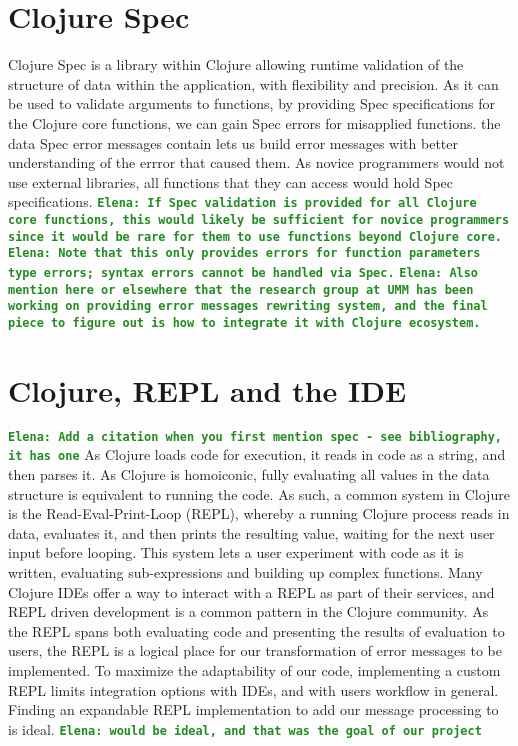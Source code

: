 \documentclass[12pt]{article}
\newcommand{\comment}[1]{{\bf \tt  {#1}}}
\newcommand{\emcomment}[1]{\textcolor{ForestGreen}{\comment{Elena: {#1}}}}
\begin{document}
\section{Clojure Spec}
Clojure Spec is a library within Clojure allowing runtime validation
of the structure of data within the application, with flexibility and precision.
As it can be used to validate arguments to functions, by providing Spec
 specifications for the Clojure core functions, we can gain Spec errors
 for misapplied functions. the data Spec error messages contain lets us build
 error messages with better understanding of the errror that caused them.
As novice programmers would not use external libraries,
 all functions that they can access would hold Spec specifications.
\emcomment{If Spec validation is provided for all Clojure core functions,
this would likely be sufficient for novice programmers since it would be
rare for them to use functions beyond Clojure core.}
\emcomment{Note that this only provides errors for function parameters
type errors; syntax errors cannot be handled via Spec.}
\emcomment{Also mention here or elsewhere that the research group at UMM has been
working on providing error messages rewriting system, and the final piece to figure
out is how to integrate it with Clojure ecosystem.}


\section{Clojure, REPL and the IDE}
\emcomment{Add a citation when you first mention spec - see bibliography, it has one}
As Clojure loads code for execution, it reads in code as a string,
and then parses it. As Clojure is homoiconic, fully evaluating all values in the data structure
is equivalent to running the code.
As such, a common system in Clojure is the Read-Eval-Print-Loop (REPL), whereby a running Clojure
process reads in data, evaluates it, and then prints the resulting value,
 waiting for the next user input before looping.
This system lets a user experiment with code as it is written,
 evaluating sub-expressions and building up complex functions.
Many Clojure IDEs offer a way to interact with a REPL as part of their services,
 and REPL driven development is a common pattern in the Clojure community.
 As the REPL spans both evaluating code and presenting the results of evaluation to users,
 the REPL is a logical place for our transformation of error messages to be implemented.
 To maximize the adaptability of our code, implementing a custom REPL limits integration
 options with IDEs, and with users workflow in general.
  Finding an expandable REPL implementation to add our message processing to
  is ideal. \emcomment{would be ideal, and that was the goal of our project}
\end{document}
